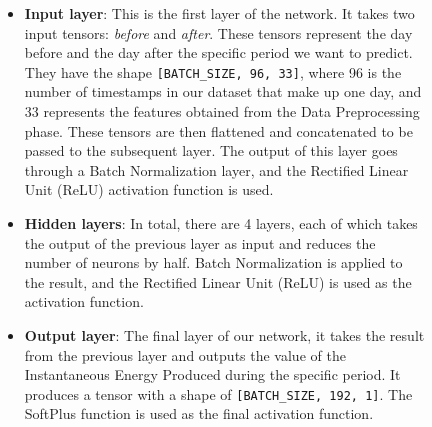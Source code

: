 \begin{figure}[H]
	\begin{minipage}{0.6\textwidth}
		\begin{itemize}
			\item \textbf{Input layer}: This is the first layer of the network.
			      It takes two input tensors: \textit{before} and \textit{after}.
			      These tensors represent the day before and the day after the specific period we want to
			      predict. They have the shape \verb|[BATCH_SIZE, 96, 33]|, where 96 is the number
			      of timestamps in our dataset that make up one day, and 33 represents the
			      features obtained from the Data Preprocessing phase.
			      These tensors are then flattened and concatenated to be passed to the subsequent layer.
			      The output of this layer goes through a Batch Normalization\cite{batchnorm} layer, and the
			      Rectified Linear Unit (ReLU)\cite{functions} activation function is used.


			\item \textbf{Hidden layers}: In total, there are 4 layers, each of which takes the
			      output of the previous layer as input and reduces the number of neurons by half.
			      Batch Normalization\cite{batchnorm} is applied to the result, and the Rectified Linear Unit (ReLU)\cite{functions}
			      is used as the activation function.


			\item \textbf{Output layer}: The final layer of our network, it takes the result from the
			      previous layer and outputs the value of the Instantaneous Energy Produced
			      during the specific period.
			      It produces a tensor with a shape of \verb|[BATCH_SIZE, 192, 1]|.
			      The SoftPlus\cite{functions} function is used as the final activation function.


\end{itemize}
\end{minipage}
\end{figure}

